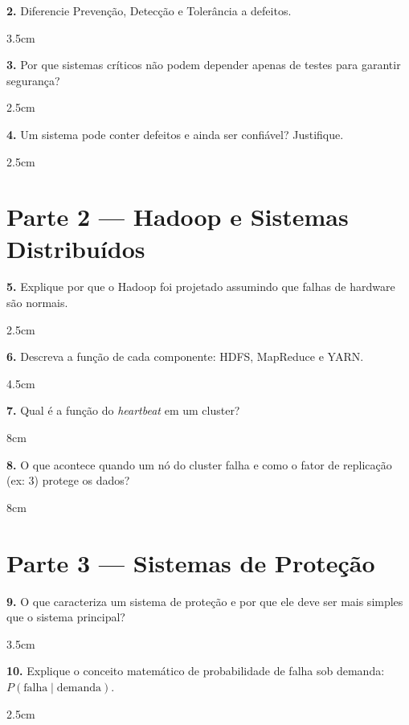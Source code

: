 \documentclass[12pt,a4paper,twoside]{report}
\begin{document}
\textbf{2.} Diferencie Prevenção, Detecção e Tolerância a defeitos.
\begin{resposta}{3.5cm}
\end{resposta}

\textbf{3.} Por que sistemas críticos não podem depender apenas de testes para garantir segurança?
\begin{resposta}{2.5cm}
\end{resposta}

\textbf{4.} Um sistema pode conter defeitos e ainda ser confiável? Justifique.
\begin{resposta}{2.5cm}
\end{resposta}

\newpage

\section*{Parte 2 — Hadoop e Sistemas Distribuídos}

\textbf{5.} Explique por que o Hadoop foi projetado assumindo que falhas de hardware são normais.
\begin{resposta}{2.5cm}
\end{resposta}

\textbf{6.} Descreva a função de cada componente: HDFS, MapReduce e YARN.
\begin{resposta}{4.5cm}
\end{resposta}

\textbf{7.} Qual é a função do \textit{heartbeat} em um cluster?
\begin{resposta}{8cm}
\end{resposta}

\textbf{8.} O que acontece quando um nó do cluster falha e como o fator de replicação (ex: 3) protege os dados?
\begin{resposta}{8cm}
\end{resposta}

\section*{Parte 3 — Sistemas de Proteção}

\textbf{9.} O que caracteriza um sistema de proteção e por que ele deve ser mais simples que o sistema principal?
\begin{resposta}{3.5cm}
\end{resposta}

\textbf{10.} Explique o conceito matemático de probabilidade de falha sob demanda: $P(\text{falha} \mid \text{demanda})$.
\begin{resposta}{2.5cm}
\end{resposta}
\end{document}
